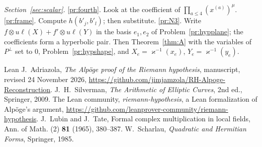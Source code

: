 \documentclass[reqno]{amsart}
\theoremstyle{definition}
\theoremstyle{plain}
\theoremstyle{remark}
\begin{document}
\noindent\emph{Section~\ref{sec:scalar}.}
\ref{pr:fourth}. Look at the coefficient of \(\prod_{a\le4}(x^{(a)})^\mu\).
\ref{pr:frame}. Compute \(h(b'_j,b'_l)\); then substitute.
\ref{pr:N3}. Write \(f\otimes u\ell(X)+f'\otimes u\ell(Y)\) in the basis \(e_1,e_2\) of Problem~\ref{pr:hypplane}; the coefficients form a hyperbolic pair.  Then Theorem~\ref{thm:A} with the variables of \(P^\perp\) set to \(0\), Problem~\ref{pr:hypshape}, and \(X_e=\varkappa^{-1}(x_e)\), \(Y_e=\varkappa^{-1}(y_e)\).

\begin{thebibliography}{Lean}
J.~Adriazola, \emph{The Alp\"oge proof of the Riemann hypothesis}, manuscript, revised 24 November 2026, \url{https://github.com/jimjamzola/RH-Alpoge-Reconstruction}.
 J.~H.~Silverman, \emph{The Arithmetic of Elliptic Curves}, 2nd ed., Springer, 2009.
 The Lean community, \emph{riemann-hypothesis}, a Lean formalization of Alp\"oge's argument, \url{https://github.com/leanprover-community/riemann-hypothesis}.
 J.~Lubin and J.~Tate, Formal complex multiplication in local fields, Ann. of Math. (2) \textbf{81} (1965), 380--387.
 W.~Scharlau, \emph{Quadratic and Hermitian Forms}, Springer, 1985.
\end{thebibliography}
\end{document}

